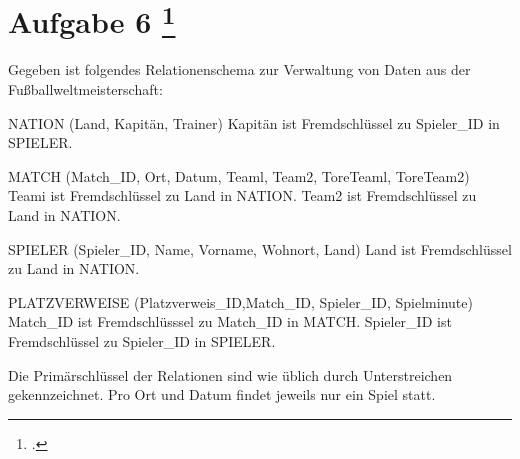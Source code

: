 \documentclass{lehramt-informatik-aufgabe}
\begin{document}
\section{Aufgabe 6
\footcite{66116:2021:03}}

Gegeben ist folgendes Relationenschema zur Verwaltung von Daten aus der Fußballweltmeisterschaft:

NATION (Land, Kapitän, Trainer)
Kapitän ist Fremdschlüssel zu Spieler\_ID in SPIELER.

MATCH (Match\_ID, Ort, Datum, Teaml, Team2, ToreTeaml, ToreTeam2)
Teami ist Fremdschlüssel zu Land in NATION.
Team2 ist Fremdschlüssel zu Land in NATION.

SPIELER (Spieler\_ID, Name, Vorname, Wohnort, Land)
Land ist Fremdschlüssel zu Land in NATION.

PLATZVERWEISE (Platzverweis\_ID,Match\_ID, Spieler\_ID, Spielminute)
Match\_ID ist Fremdschlüsssel zu Match\_ID in MATCH.
Spieler\_ID ist Fremdschlüssel zu Spieler\_ID in SPIELER.

Die Primärschlüssel der Relationen sind wie üblich durch Unterstreichen
gekennzeichnet. Pro Ort und Datum findet jeweils nur ein Spiel statt.
\end{document}
